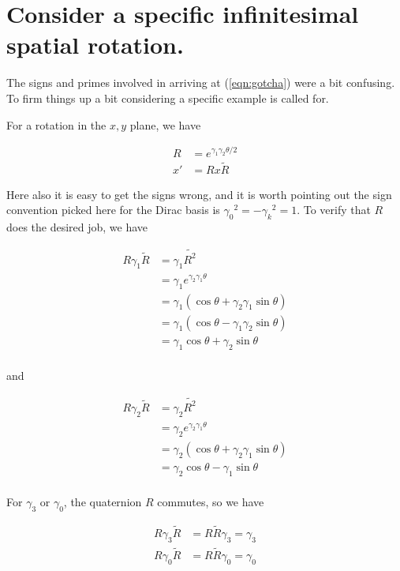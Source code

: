 \section{Consider a specific infinitesimal spatial rotation.}

The signs and primes involved in arriving at (\ref{eqn:gotcha}) were a bit confusing.  To firm things up a bit considering a specific example is called for.

For a rotation in the $x,y$ plane, we have

\begin{align}
R &= e^{\gamma_1 \gamma_2 \theta/2} \\
x' &= R x \tilde{R}
\end{align}

Here also it is easy to get the signs wrong, and it is worth pointing out the sign convention picked here for the Dirac basis is ${\gamma_0}^2 = -{\gamma_k}^2 = 1$.  To verify that $R$ does the desired job, we have

\begin{align*}
R \gamma_1 \tilde{R}
&=
\gamma_1 \tilde{R^2} \\
&=
\gamma_1 e^{\gamma_2 \gamma_1 \theta} \\
&=
\gamma_1 (\cos\theta + \gamma_2 \gamma_1 \sin\theta) \\
&=
\gamma_1 (\cos\theta - \gamma_1 \gamma_2 \sin\theta) \\
&=
\gamma_1 \cos\theta + \gamma_2 \sin\theta \\
\end{align*}

and 

\begin{align*}
R \gamma_2 \tilde{R}
&=
\gamma_2 \tilde{R^2} \\
&=
\gamma_2 e^{\gamma_2 \gamma_1 \theta} \\
&=
\gamma_2 (\cos\theta + \gamma_2 \gamma_1 \sin\theta) \\
&=
\gamma_2 \cos\theta - \gamma_1 \sin\theta \\
\end{align*}

For $\gamma_3$ or $\gamma_0$, the quaternion $R$ commutes, so we have

\begin{align*}
R \gamma_3 \tilde{R} &= R \tilde{R} \gamma_3 = \gamma_3 \\
R \gamma_0 \tilde{R} &= R \tilde{R} \gamma_0 = \gamma_0 \\
\end{align*}

